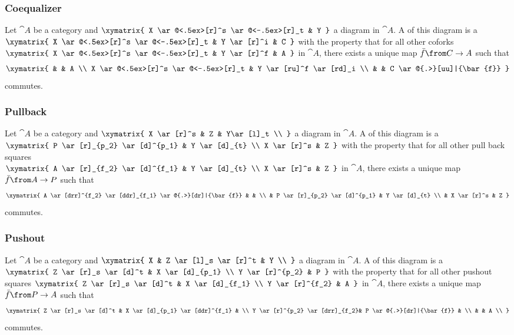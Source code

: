 \documentclass{beamer}
\begin{document}
\begin{frame}
  \frametitle{Coequalizer}

  Let $\cat{A}$ be a category and
  $ \xymatrix{
    X \ar@<.5ex>[r]^s \ar@<-.5ex>[r]_t & Y
  } $
  a diagram in $\cat{A}$.
  A  of this diagram is a  \\
  $ \xymatrix{
    X \ar@<.5ex>[r]^s \ar@<-.5ex>[r]_t & Y \ar[r]^i & C
  } $
  with the property that for all other coforks
  $ \xymatrix{
    X \ar@<.5ex>[r]^s \ar@<-.5ex>[r]_t & Y \ar[r]^f & A
  } $
  in $\cat{A}$, there exists a unique map $\bar{f}\from C \to A$ such that
  \[ \xymatrix{
    & & A  \\
    X \ar@<.5ex>[r]^s \ar@<-.5ex>[r]_t & Y \ar[ru]^f \ar[rd]_i \\
    & & C \ar@{.>}[uu]|{\bar{f}}
  } \]
  commutes.
\end{frame}

\begin{frame}
  \frametitle{Pullback}

  Let $\cat{A}$ be a category and
  $ \xymatrix{
    X \ar[r]^s & Z & Y\ar[l]_t \\
  } $
  a diagram in $\cat{A}$.
  A  of this diagram is a  \\
  $ \xymatrix{
    P \ar[r]_{p_2} \ar[d]^{p_1} & Y \ar[d]_{t} \\
    X \ar[r]^s & Z
  } $
  with the property that for all other pull back squares \\
  $ \xymatrix{
    A \ar[r]_{f_2} \ar[d]^{f_1} & Y \ar[d]_{t} \\
    X \ar[r]^s & Z
  } $
  in $\cat{A}$, there exists a unique map $\bar{f}\from A \to P$ such that
  \[ \xymatrix{
    A \ar[drr]^{f_2} \ar[ddr]_{f_1} \ar@{.>}[dr]|{\bar{f}} & & \\
    & P \ar[r]_{p_2} \ar[d]^{p_1} & Y \ar[d]_{t} \\
    & X \ar[r]^s & Z
  } \]
  commutes.
\end{frame}

\begin{frame}
  \frametitle{Pushout}

  Let $\cat{A}$ be a category and
  $ \xymatrix{
    X & Z \ar[l]_s \ar[r]^t & Y \\
  } $
  a diagram in $\cat{A}$.
  A  of this diagram is a  \\
  $ \xymatrix{
    Z \ar[r]_s \ar[d]^t & X \ar[d]_{p_1} \\
    Y \ar[r]^{p_2} & P
  } $
  with the property that for all other pushout squares
  $ \xymatrix{
    Z \ar[r]_s \ar[d]^t & X \ar[d]_{f_1} \\
    Y \ar[r]^{f_2} & A
  } $
  in $\cat{A}$, there exists a unique map $\bar{f}\from P \to A$ such that
  \[ \xymatrix{
    Z \ar[r]_s \ar[d]^t & X \ar[d]_{p_1} \ar[ddr]^{f_1} & \\
    Y \ar[r]^{p_2} \ar[drr]_{f_2}& P \ar@{.>}[dr]|{\bar{f}} & \\
    & & A  \\
  } \]
  commutes.
\end{frame}
\end{document}
